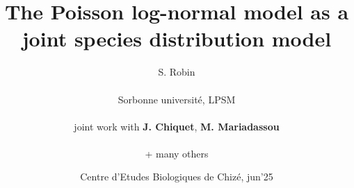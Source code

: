 \documentclass[8pt]{beamer}
\begin{document}
\title[PLN as a JSDM]{The Poisson log-normal model as a joint species distribution model}

\author[S. Robin]{S. Robin \\ ~\\
  {\small Sorbonne universit\'e, LPSM} \\ ~\\
  joint work with {\bf J. Chiquet}, {\bf M. Mariadassou} \\ ~\\ 
  + many others \\
  \nocite{CMR18a,CMR19,CMR20,CMR21}}

\date[CEBC, jun'25]{\small Centre d'Etudes Biologiques de Chiz\'e, jun'25}

\maketitle












\end{document}
